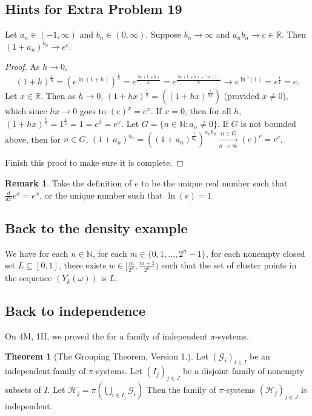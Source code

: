 \documentclass{article}
\newcommand{\R}{\mathbb{R}}
\newcommand{\N}{\mathbb{N}}
\theoremstyle{definition}
\newtheorem*{remark}{Remark}
\newtheorem*{theorem*}{Theorem}
\begin{document}
\subsection*{Hints for Extra Problem 19}
Let $a_n \in (-1, \infty)$ and $b_n \in (0, \infty)$. Suppose $b_n \to \infty$ and $a_n b_n \to c \in \R$. Then $(1+a_n)^{b_n} \to e^c$.
\begin{proof}
    As $h \to 0$,
    \[(1+h)^\frac{1}{h} = \left( e^{\ln(1+h)} \right)^\frac{1}{h} = e^\frac{\ln(1+h)}{h} = e^\frac{\ln(1+h)-\ln(1)}{h} \to e^{\ln'(1)} = e^\frac{1}{1} = e.\]
    Let $x \in \R$. Then as $h \to 0$, $(1+hx)^\frac{1}{h} = \left((1+hx)^\frac{1}{hx}\right)$ (provided $x \neq 0$), which since $hx \to 0$ goes to $(e)^x = e^x$.
    If $x = 0$, then for all $h$, $(1+hx)^\frac{1}{h} = 1^\frac{1}{h} = 1 = e^0 = e^x$.
    Let $G = \{n \in \N : a_n \neq 0\}$. If $G$ is not bounded above, then for $n \in G$, $(1+a_n)^{b_n} = \left( (1+a_n)^\frac{1}{a_n} \right)^{a_n b_n} \xrightarrow[n\to\infty]{n \in G} (e)^c = e^c$.
    
    Finish this proof to make sure it is complete.
\end{proof}
\begin{remark}
Take the definition of $e$ to be the unique real number such that $\frac{d}{dx} e^x = e^x$, or the unique number such that $\ln(e) = 1$.
\end{remark}

\subsection*{Back to the density example}
We have for each $n \in \N$, for each $m \in \{0, 1, \dots, 2^n-1\}$, for each nonempty closed set $L \subseteq [0,1]$, there exists $w \in [\frac{m}{2^n}, \frac{m+1}{2^n})$ such that the set of cluster points in the sequence $(Y_k(\omega))$ is $L$.

\subsection*{Back to independence}
On 4M, 1II, we proved the  for a family of independent $\pi$-systems.

\begin{theorem*}[The Grouping Theorem, Version 1.]
Let $(\mathscr{G}_i)_{i \in I}$ be an independent family of $\pi$-systems. Let $(I_j)_{j \in J}$ be a disjoint family of nonempty subsets of $I$. Let
$\mathscr{H}_j = \pi \left(\bigcup_{i \in I_j} \mathscr{G}_i \right)$
Then the family of $\pi$-systems $(\mathscr{H}_j)_{j \in J}$ is independent.
\end{theorem*}
\end{document}
